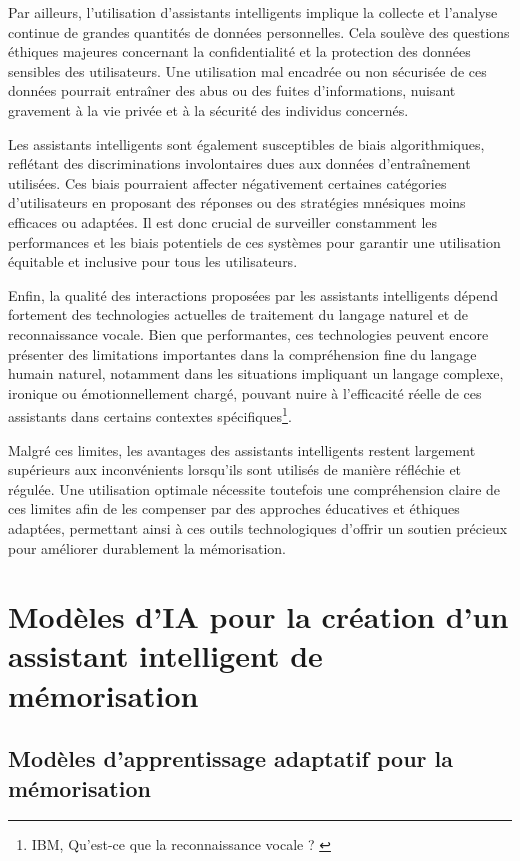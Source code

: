 \documentclass[11pt,a4paper]{report}
\begin{document}
Par ailleurs, l’utilisation d'assistants intelligents implique la collecte et l’analyse continue de grandes quantités de données personnelles. Cela soulève des questions éthiques majeures concernant la confidentialité et la protection des données sensibles des utilisateurs. Une utilisation mal encadrée ou non sécurisée de ces données pourrait entraîner des abus ou des fuites d'informations, nuisant gravement à la vie privée et à la sécurité des individus concernés.

Les assistants intelligents sont également susceptibles de biais algorithmiques, reflétant des discriminations involontaires dues aux données d’entraînement utilisées. Ces biais pourraient affecter négativement certaines catégories d’utilisateurs en proposant des réponses ou des stratégies mnésiques moins efficaces ou adaptées. Il est donc crucial de surveiller constamment les performances et les biais potentiels de ces systèmes pour garantir une utilisation équitable et inclusive pour tous les utilisateurs.

Enfin, la qualité des interactions proposées par les assistants intelligents dépend fortement des technologies actuelles de traitement du langage naturel et de reconnaissance vocale. Bien que performantes, ces technologies peuvent encore présenter des limitations importantes dans la compréhension fine du langage humain naturel, notamment dans les situations impliquant un langage complexe, ironique ou émotionnellement chargé, pouvant nuire à l'efficacité réelle de ces assistants dans certains contextes spécifiques\footnote{IBM, Qu’est-ce que la reconnaissance vocale ? \cite{ibm}}.

Malgré ces limites, les avantages des assistants intelligents restent largement supérieurs aux inconvénients lorsqu'ils sont utilisés de manière réfléchie et régulée. Une utilisation optimale nécessite toutefois une compréhension claire de ces limites afin de les compenser par des approches éducatives et éthiques adaptées, permettant ainsi à ces outils technologiques d’offrir un soutien précieux pour améliorer durablement la mémorisation.

\section{Modèles d'IA pour la création d'un assistant intelligent de mémorisation}

\subsection{Modèles d’apprentissage adaptatif pour la mémorisation}
\end{document}
